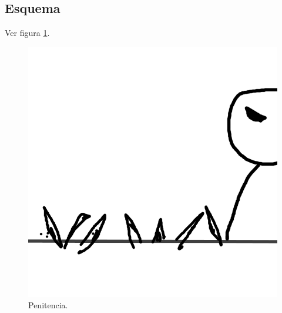 \subsection{Esquema}
			Ver figura \ref{fig:penitencia}.
			\begin{figure}
				\centering
				\includegraphics[height=0.2 \textheight]{Imagenes/penitencia}
				\caption{Penitencia.}
				\label{fig:penitencia}
			\end{figure}			
			